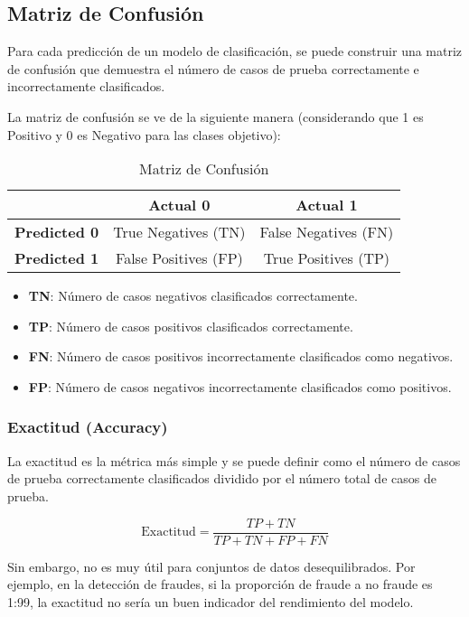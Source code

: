 \subsection{Matriz de Confusión}

Para cada predicción de un modelo de clasificación, se puede construir una matriz de confusión que demuestra el número de casos de prueba correctamente e incorrectamente clasificados.

La matriz de confusión se ve de la siguiente manera (considerando que 1 es Positivo y 0 es Negativo para las clases objetivo):

\begin{table}[h]
	\centering
	\begin{tabular}{|c|c|c|}
		\hline
		& \textbf{Actual 0} & \textbf{Actual 1} \\ \hline
		\textbf{Predicted 0} & True Negatives (TN) & False Negatives (FN) \\ \hline
		\textbf{Predicted 1} & False Positives (FP) & True Positives (TP) \\ \hline
	\end{tabular}
	\caption{Matriz de Confusión}
\end{table}

\begin{itemize}
	\item \textbf{TN}: Número de casos negativos clasificados correctamente.
	\item \textbf{TP}: Número de casos positivos clasificados correctamente.
	\item \textbf{FN}: Número de casos positivos incorrectamente clasificados como negativos.
	\item \textbf{FP}: Número de casos negativos incorrectamente clasificados como positivos.
\end{itemize}

\subsubsection{Exactitud (Accuracy)}

La exactitud es la métrica más simple y se puede definir como el número de casos de prueba correctamente clasificados dividido por el número total de casos de prueba.

\[
\text{Exactitud} = \frac{TP + TN}{TP + TN + FP + FN}
\]

Sin embargo, no es muy útil para conjuntos de datos desequilibrados. Por ejemplo, en la detección de fraudes, si la proporción de fraude a no fraude es 1:99, la exactitud no sería un buen indicador del rendimiento del modelo.

